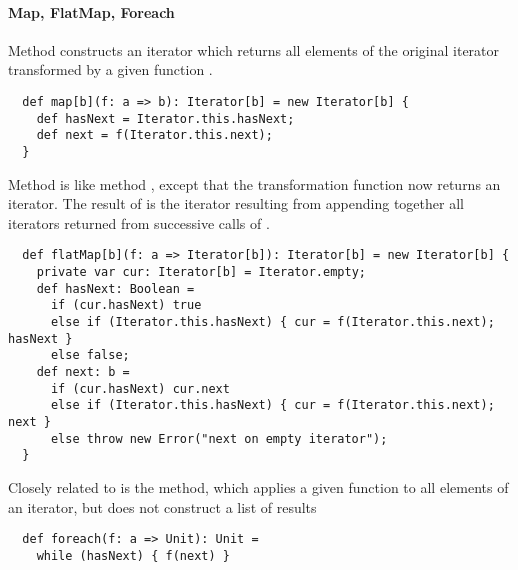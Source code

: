 {\paragraph{Map, FlatMap, Foreach} Method  
constructs an iterator which returns all elements of the original
iterator transformed by a given function .
\begin{lstlisting}
  def map[b](f: a => b): Iterator[b] = new Iterator[b] {
    def hasNext = Iterator.this.hasNext;
    def next = f(Iterator.this.next);
  }
\end{lstlisting}
Method  is like method , except that the
transformation function  now returns an iterator.
The result of  is the iterator resulting from appending
together all iterators returned from successive calls of .
\begin{lstlisting}
  def flatMap[b](f: a => Iterator[b]): Iterator[b] = new Iterator[b] {
    private var cur: Iterator[b] = Iterator.empty;
    def hasNext: Boolean = 
      if (cur.hasNext) true
      else if (Iterator.this.hasNext) { cur = f(Iterator.this.next); hasNext }
      else false;
    def next: b = 
      if (cur.hasNext) cur.next
      else if (Iterator.this.hasNext) { cur = f(Iterator.this.next); next }
      else throw new Error("next on empty iterator");
  }
\end{lstlisting}
Closely related to  is the  method, which
applies a given function to all elements of an iterator, but does not
construct a list of results
\begin{lstlisting}
  def foreach(f: a => Unit): Unit = 
    while (hasNext) { f(next) }
\end{lstlisting}

}
